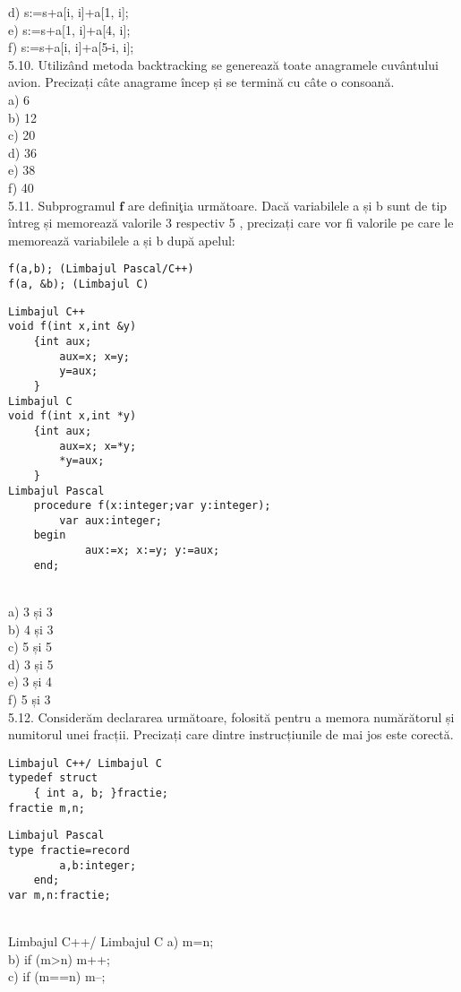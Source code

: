 d) s:=s+a[i, i]+a[1, i];
\\
e) s:=s+a[1, i]+a[4, i];
\\
f) s:=s+a[i, i]+a[5-i, i];
\\
5.10. Utilizând metoda backtracking se generează toate anagramele cuvântului avion. Precizați câte anagrame încep și se termină cu câte o consoană.
\\
a) 6
\\
b) 12
\\
c) 20
\\
d) 36
\\
e) 38
\\
f) 40
\\
5.11. Subprogramul $\mathbf{f}$ are definiţia următoare. Dacă variabilele a și b sunt de tip întreg și memorează valorile 3 respectiv 5 , precizați care vor fi valorile pe care le memorează variabilele a și b după apelul:
\begin{verbatim}
f(a,b); (Limbajul Pascal/C++)
f(a, &b); (Limbajul C)
\end{verbatim}
\begin{verbatim}
Limbajul C++
void f(int x,int &y)
    {int aux;
        aux=x; x=y;
        y=aux;
    }
Limbajul C
void f(int x,int *y)
    {int aux;
        aux=x; x=*y;
        *y=aux;
    }
Limbajul Pascal
    procedure f(x:integer;var y:integer);
        var aux:integer;
    begin
            aux:=x; x:=y; y:=aux;
    end;
\end{verbatim}
\\
a) 3 și 3
\\
b) 4 și 3
\\
c) 5 și 5
\\
d) 3 și 5
\\
e) 3 și 4
\\
f) 5 și 3
\\
5.12. Considerăm declararea următoare, folosită pentru a memora numărătorul și numitorul unei fracții. Precizați care dintre instrucțiunile de mai jos este corectă.
\begin{verbatim}
Limbajul C++/ Limbajul C
typedef struct
    { int a, b; }fractie;
fractie m,n;
\end{verbatim}
\begin{verbatim}
Limbajul Pascal
type fractie=record
        a,b:integer;
    end;
var m,n:fractie;
\end{verbatim}
\\
Limbajul C++/ Limbajul C
a) m=n;
\\
b) if (m>n) m++;
\\
c) if (m==n) m--;
